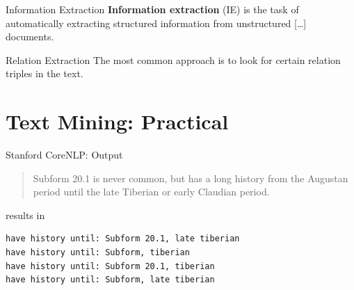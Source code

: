 \documentclass[xcolor=x11names, aspectratio=169]{beamer}
\begin{document}
\begin{frame}{Information Extraction}
\textbf{Information extraction} (IE) is the task of automatically extracting structured information from unstructured [\dots] documents.

\end{frame}

\begin{frame}{Relation Extraction}
The most common approach is to look for certain \alert{relation triples} in the text.
\end{frame}

\section{Text Mining: Practical}

\begin{frame}[fragile]{Stanford CoreNLP: Output}
\begin{quote}
Subform 20.1 is never common, but has a long history from the Augustan period until the late Tiberian or early Claudian period.
\end{quote}
results in
\begin{verbatim}
have history until: Subform 20.1, late tiberian
have history until: Subform, tiberian
have history until: Subform 20.1, tiberian
have history until: Subform, late tiberian
\end{verbatim}
\end{frame}

\maketitle
\end{document}
